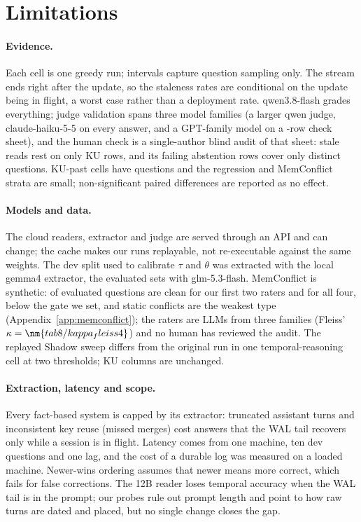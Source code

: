 \section{Limitations}
\label{sec:limitations}

\paragraph{Evidence.}
Each cell is one greedy run; intervals capture question sampling only. The stream ends right after the update, so the staleness rates are conditional on the update being in flight, a worst case rather than a deployment rate. qwen3.8-flash grades everything; judge validation spans three model families (a larger qwen judge, claude-haiku-5-5 on every answer, and a GPT-family model on a -row check sheet), and the human check is a single-author blind audit of that sheet: stale reads rest on only  KU rows, and its  failing abstention rows cover only  distinct questions. KU-past cells have  questions and the regression and MemConflict strata are small; non-significant paired differences are reported as no effect.

\paragraph{Models and data.}
The cloud readers, extractor and judge are served through an API and can change; the cache makes our runs replayable, not re-executable against the same weights. The dev split used to calibrate $\tau$ and $\theta$ was extracted with the local gemma4 extractor, the evaluated sets with glm-5.3-flash. MemConflict is synthetic:  of  evaluated questions are clean for our first two raters and  for all four, below the gate we set, and static conflicts are the weakest type (Appendix~\ref{app:memconflict}); the raters are LLMs from three families (Fleiss' $\kappa=\nm{tab8/kappa_fleiss4}$) and no human has reviewed the audit. The replayed Shadow sweep differs from the original run in one temporal-reasoning cell at two thresholds; KU columns are unchanged.

\paragraph{Extraction, latency and scope.}
Every fact-based system is capped by its extractor: truncated assistant turns and inconsistent key reuse (missed merges) cost answers that the WAL tail recovers only while a session is in flight. Latency comes from one machine, ten dev questions and one lag, and the cost of a durable log was measured on a loaded machine. Newer-wins ordering assumes that newer means more correct, which fails for false corrections. The 12B reader loses temporal accuracy when the WAL tail is in the prompt; our probes rule out prompt length and point to how raw turns are dated and placed, but no single change closes the gap.

